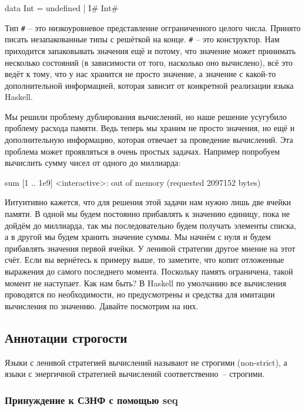 \begin{code}
data Int = undefined  | I# Int# 
\end{code}

Тип \verb!#! -- это низкоуровневое представление 
огграниченного целого числа. Принято писать незапакованные
типы с решёткой на конце. \verb!#! -- это конструктор. 
Нам приходится запаковывать значения ещё и потому, что
значение может принимать несколько состояний (в зависимости
от того, насколько оно вычислено), всё это ведёт к тому,
что у нас хранится не просто значение, а значение
с какой-то дополнительной информацией, которая зависит
от конкретной реализации языка Haskell. 

Мы решили проблему дублирования вычислений, но наше решение 
усугубило проблему расхода памяти. Ведь теперь мы храним
не просто значения, но ещё и дополнительную информацию,
которая отвечает за проведение вычислений. 
Эта проблема может проявляться в очень простых задачах.
Например попробуем вычислить сумму чисел от одного до миллиарда:

\begin{code}
sum [1 .. 1e9]
<interactive>: out of memory (requested 2097152 bytes)
\end{code}

Интуитивно кажется, что для решения этой задачи нам нужно 
лишь две ячейки памяти. В одной мы будем постоянно прибавлять 
к значению единицу, пока не дойдём до миллиарда, так 
мы последовательно будем получать 
элементы списка, а в другой мы будем хранить значение суммы.
Мы начнём с нуля и будем прибавлять значения первой ячейки. 
У ленивой стратегии другое мнение на этот счёт.
Если вы вернётесь к примеру выше, то заметите, что 
 копит отложенные выражения до самого 
последнего момента. Поскольку память ограничена, такой 
момент не наступает. Как нам быть? В Haskell по умолчанию
все вычисления проводятся по необходимости, но
предусмотрены и средства для имитации вычисления по значению.
Давайте посмотрим на них.


\subsection{Аннотации строгости}

Языки с ленивой стратегией вычислений называют не строгими (non-strict),
а языки с энергичной стратегией вычислений соответственно~-- строгими.

\subsubsection{Принуждение к СЗНФ с помощью seq}

